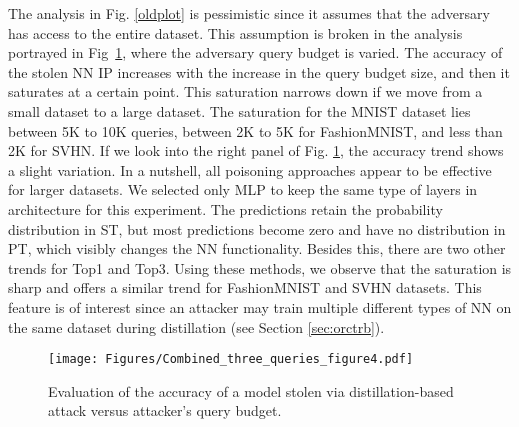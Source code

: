 \documentclass[10pt, twocolumn, conference]{IEEEtran}
\begin{document}

The analysis in Fig. \ref{oldplot} is pessimistic since it assumes that the adversary has access to the entire dataset. This assumption is broken in the analysis portrayed in Fig~\ref{figAcc}, where the adversary query budget is varied. The accuracy of the stolen NN IP increases with the increase in the query budget size, and then it saturates at a certain point. This saturation narrows down if we move from a small dataset to a large dataset. The saturation for the MNIST dataset lies between 5K to 10K queries, between 2K to 5K for FashionMNIST, and less than 2K for SVHN. If we look into the right panel of Fig. \ref{figAcc}, the accuracy trend shows a slight variation. In a nutshell, all poisoning approaches appear to be effective for larger datasets. We selected only MLP to keep the same type of layers in architecture for this experiment. The predictions retain the probability distribution in ST, but most predictions become zero and have no distribution in PT, which visibly changes the NN functionality. Besides this, there are two other trends for Top1 and Top3. Using these methods, we observe that the saturation is sharp and offers a similar trend for FashionMNIST and SVHN datasets. This feature is of interest since an attacker may train multiple different types of NN on the same dataset during distillation (see Section \ref{sec:orctrb}).

\begin{figure}[tb]
\centering
{\texttt{[image: Figures/Combined\_three\_queries\_figure4.pdf]}}\vspace{-10pt}
\caption{Evaluation of the accuracy of a model stolen via distillation-based attack versus attacker's query budget.}\vspace{-10pt}
\label{figAcc}
\end{figure}
\end{document}
